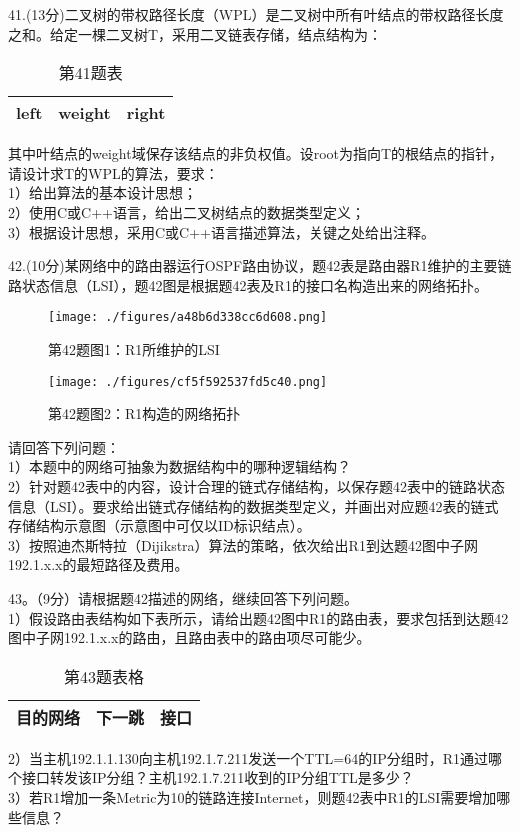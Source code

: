 41.(13分)二叉树的带权路径长度（WPL）是二叉树中所有叶结点的带权路径长度之和。给定一棵二叉树T，采用二叉链表存储，结点结构为：
\begin{table}[ht]
\centering
\caption{第41题表}\label{tab_CSN14_1}
\begin{tabular}{|c|c|c|}
\hline
left & weight & right \\
\hline
\end{tabular}
\end{table}
其中叶结点的weight域保存该结点的非负权值。设root为指向T的根结点的指针，请设计求T的WPL的算法，要求： \\
1）给出算法的基本设计思想； \\
2）使用C或C++语言，给出二叉树结点的数据类型定义； \\
3）根据设计思想，采用C或C++语言描述算法，关键之处给出注释。

42.(10分)某网络中的路由器运行OSPF路由协议，题42表是路由器R1维护的主要链路状态信息（LSI），题42图是根据题42表及R1的接口名构造出来的网络拓扑。
\begin{figure}[ht]
\centering
\texttt{[image: ./figures/a48b6d338cc6d608.png]}
\caption{第42题图1：R1所维护的LSI} \label{fig_CSN14_4}
\end{figure}

\begin{figure}[ht]
\centering
\texttt{[image: ./figures/cf5f592537fd5c40.png]}
\caption{第42题图2：R1构造的网络拓扑} \label{fig_CSN14_5}
\end{figure}
请回答下列问题： \\
1）本题中的网络可抽象为数据结构中的哪种逻辑结构？ \\
2）针对题42表中的内容，设计合理的链式存储结构，以保存题42表中的链路状态信息（LSI）。要求给出链式存储结构的数据类型定义，并画出对应题42表的链式存储结构示意图（示意图中可仅以ID标识结点）。 \\
3）按照迪杰斯特拉（Dijikstra）算法的策略，依次给出R1到达题42图中子网192.1.x.x的最短路径及费用。

43。（9分）请根据题42描述的网络，继续回答下列问题。 \\
1）假设路由表结构如下表所示，请给出题42图中R1的路由表，要求包括到达题42图中子网192.1.x.x的路由，且路由表中的路由项尽可能少。 \\
\begin{table}[ht]
\centering
\caption{第43题表格}\label{tab_CSN14_2}
\begin{tabular}{|c|c|c|}
\hline
目的网络 & 下一跳 & 接口 \\
\hline
\end{tabular}
\end{table}
2）当主机192.1.1.130向主机192.1.7.211发送一个TTL=64的IP分组时，R1通过哪个接口转发该IP分组？主机192.1.7.211收到的IP分组TTL是多少？ \\
3）若R1增加一条Metric为10的链路连接Internet，则题42表中R1的LSI需要增加哪些信息？


